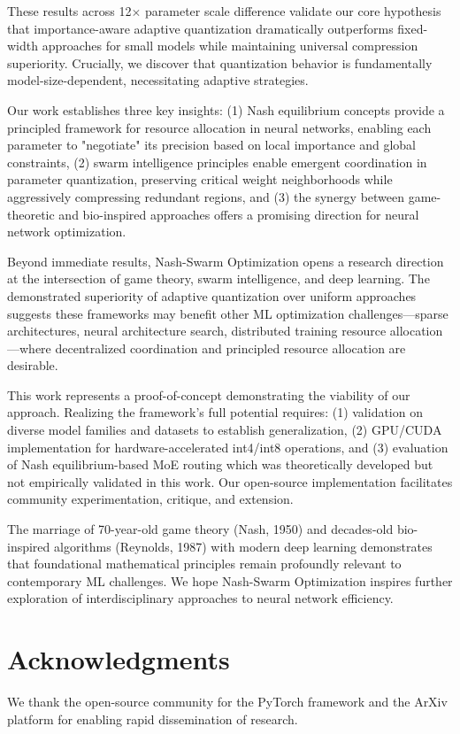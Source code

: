 \documentclass[11pt]{article}
\begin{document}
These results across 12$\times$ parameter scale difference validate our core hypothesis that importance-aware adaptive quantization dramatically outperforms fixed-width approaches for small models while maintaining universal compression superiority. Crucially, we discover that quantization behavior is fundamentally model-size-dependent, necessitating adaptive strategies.

Our work establishes three key insights: (1) Nash equilibrium concepts provide a principled framework for resource allocation in neural networks, enabling each parameter to "negotiate" its precision based on local importance and global constraints, (2) swarm intelligence principles enable emergent coordination in parameter quantization, preserving critical weight neighborhoods while aggressively compressing redundant regions, and (3) the synergy between game-theoretic and bio-inspired approaches offers a promising direction for neural network optimization.

Beyond immediate results, Nash-Swarm Optimization opens a research direction at the intersection of game theory, swarm intelligence, and deep learning. The demonstrated superiority of adaptive quantization over uniform approaches suggests these frameworks may benefit other ML optimization challenges---sparse architectures, neural architecture search, distributed training resource allocation---where decentralized coordination and principled resource allocation are desirable.

This work represents a proof-of-concept demonstrating the viability of our approach. Realizing the framework's full potential requires: (1) validation on diverse model families and datasets to establish generalization, (2) GPU/CUDA implementation for hardware-accelerated int4/int8 operations, and (3) evaluation of Nash equilibrium-based MoE routing which was theoretically developed but not empirically validated in this work. Our open-source implementation facilitates community experimentation, critique, and extension.

The marriage of 70-year-old game theory (Nash, 1950) and decades-old bio-inspired algorithms (Reynolds, 1987) with modern deep learning demonstrates that foundational mathematical principles remain profoundly relevant to contemporary ML challenges. We hope Nash-Swarm Optimization inspires further exploration of interdisciplinary approaches to neural network efficiency.

\section*{Acknowledgments}
We thank the open-source community for the PyTorch framework and the ArXiv platform for enabling rapid dissemination of research.



\end{document}
